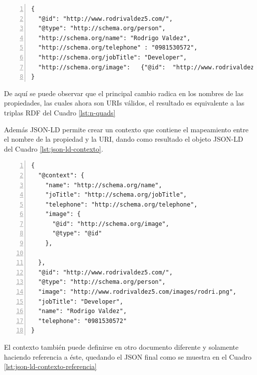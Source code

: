 \noindent\begin{minipage}{\textwidth}
\begin{lstlisting}[captionpos=b, caption=Ejemplo de un documento JSON-LD, label=lst:json-ld,  numbers=left,  numberstyle=\tiny\color{mygray},frame=single]
{
  "@id": "http://www.rodrivaldez5.com/",
  "@type": "http://schema.org/person",
  "http://schema.org/name": "Rodrigo Valdez",
  "http://schema.org/telephone" : "0981530572",
  "http://schema.org/jobTitle": "Developer",
  "http://schema.org/image":   {"@id":  "http://www.rodrivaldez5.com/images/rodri.png"} 
}
\end{lstlisting}
\end{minipage}
De aquí se puede observar que el principal cambio radica en los nombres de las propiedades, las cuales ahora son URIs válidos, el resultado es equivalente a las triplas RDF del Cuadro \ref{lst:n-quads}

Además JSON-LD permite crear un contexto que contiene el mapeamiento entre el nombre de la propiedad y la URI, dando como resultado el objeto JSON-LD del Cuadro \ref{lst:json-ld-contexto}. \hfill \break

\noindent\begin{minipage}{\textwidth}
\begin{lstlisting}[captionpos=b, caption=Ejemplo de un documento JSON-LD con Contexto, label=lst:json-ld-contexto,  numbers=left,  numberstyle=\tiny\color{mygray},frame=single]
{
  "@context": {
    "name": "http://schema.org/name",  
    "joTitle": "http://schema.org/jobTitle",  
    "telephone": "http://schema.org/telephone",  
    "image": {
      "@id": "http://schema.org/image",  
      "@type": "@id"  
    },
  
  },
  "@id": "http://www.rodrivaldez5.com/",
  "@type": "http://schema.org/person",
  "image": "http://www.rodrivaldez5.com/images/rodri.png",
  "jobTitle": "Developer",
  "name": "Rodrigo Valdez",
  "telephone": "0981530572"
}
\end{lstlisting}
\end{minipage}
El contexto también puede definirse en otro documento diferente y solamente haciendo referencia a éste, quedando el JSON final como se muestra en el Cuadro \ref{lst:json-ld-contexto-referencia}

